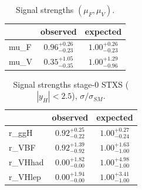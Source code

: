 \documentclass[11pt,a4paper]{article}
\begin{document}
\begin{table}[H]\centering\small\caption{Signal strengths $(\mu_F,\mu_V)$.}\begin{tabular}{lcc}\toprule  & observed & expected\\\midrule
mu\_F & $0.96^{+0.26}_{-0.23}$ & $1.00^{+0.26}_{-0.23}$\\
mu\_V & $0.35^{+1.05}_{-0.35}$ & $1.00^{+1.29}_{-0.96}$\\
\bottomrule\end{tabular}\end{table}
\begin{table}[H]\centering\small\caption{Signal strengths stage-0 STXS ($|y_H|<2.5$), $\sigma/\sigma_{SM}$.}\begin{tabular}{lcc}\toprule  & observed & expected\\\midrule
r\_ggH & $0.92^{+0.25}_{-0.22}$ & $1.00^{+0.27}_{-0.24}$\\
r\_VBF & $0.92^{+1.39}_{-0.92}$ & $1.00^{+1.63}_{-1.00}$\\
r\_VHhad & $0.00^{+1.82}_{-0.00}$ & $1.00^{+4.98}_{-1.00}$\\
r\_VHlep & $0.00^{+1.94}_{-0.00}$ & $1.00^{+3.41}_{-1.00}$\\
\bottomrule\end{tabular}\end{table}
\end{document}
